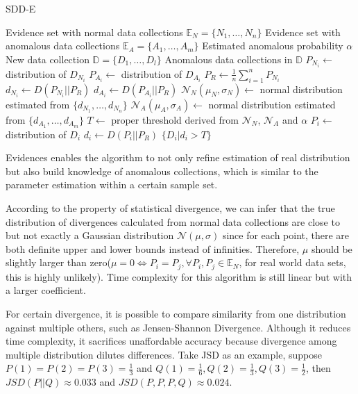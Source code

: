 \documentclass[10pt,conference,letterpaper]{article}
\begin{document}
			\begin{algorithm}[!t]
				\caption{SDD-E}
				\label{alg:sdd-e}
				\begin{algorithmic}[1]
					\Require Evidence set with normal data collections $\mathbb{E}_N = \{N_1, \dots, N_n\}$
					\Require Evidence set with anomalous data collections $\mathbb{E}_A = \{A_1, \dots, A_m\}$
					\Require Estimated anomalous probability $\alpha$
					\Require New data collection $\mathbb{D} = \{D_1, \dots, D_l\}$
					\Ensure Anomalous data collections in $\mathbb{D}$
						\State $P_{N_i} \gets$ distribution of $D_{N_i}$\label{line:hist-1}
					\EndFor
						\State $P_{A_i} \gets$ distribution of $D_{A_i}$\label{line:hist-2}
					\EndFor
					\State $P_R \gets \frac{1}{n}\sum_{i=1}^{n}P_{N_i}$
						\State $d_{N_i} \gets D(P_{N_i}||P_R)$
					\EndFor
						\State $d_{A_i} \gets D(P_{A_i}||P_R)$
					\EndFor
					\State $\mathcal{N}_N(\mu_N, \sigma_N) \gets$ normal distribution estimated from $\{d_{N_1}, \dots, d_{N_n}\}$
					\State $\mathcal{N}_A(\mu_A, \sigma_A) \gets$  normal distribution estimated from $\{d_{A_1}, \dots, d_{A_m}\}$
					\State $T \gets$ proper threshold derived from $\mathcal{N}_N$, $\mathcal{N}_A$ and $\alpha$
						\State $P_i \gets$ distribution of $D_i$
						\State $d_i \gets D(P_i||P_R)$
					\EndFor
					\State \Return $\{D_i|d_i > T\}$
				\end{algorithmic}
			\end{algorithm}
			
			Evidences enables the algorithm to not only refine estimation of real distribution but also build knowledge of anomalous collections, which is similar to the parameter estimation within a certain sample set.
			
			According to the property of statistical divergence, we can infer that the true distribution of divergences calculated from normal data collections are close to but not exactly a Gaussian distribution $\mathcal{N}(\mu, \sigma)$ since for each point, there are both definite upper and lower bounds instead of infinities. Therefore, $\mu$ should be slightly larger than zero($\mu = 0 \iff P_i = P_j, \forall P_i, P_j \in \mathbb{E}_N$, for real world data sets, this is highly unlikely). Time complexity for this algorithm is still linear but with a larger coefficient.
			
			For certain divergence, it is possible to compare similarity from one distribution against multiple others, such as Jensen-Shannon Divergence. Although it reduces time complexity, it sacrifices unaffordable accuracy because divergence among multiple distribution dilutes differences. Take JSD as an example, suppose $P(1) = P(2) = P(3) = \frac{1}{3}$ and $Q(1) = \frac{1}{6}, Q(2) = \frac{1}{3}, Q(3) = \frac{1}{2}$, then $JSD(P||Q) \approx 0.033$ and $JSD(P, P, P, Q) \approx 0.024$.
			
\end{document}
